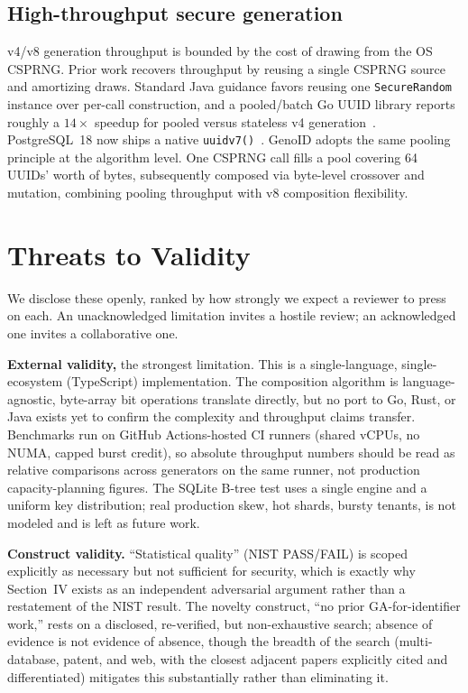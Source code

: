 \documentclass[conference]{IEEEtran}
\begin{document}
\subsection{High-throughput secure generation}
v4/v8 generation throughput is bounded by the cost of drawing from the OS CSPRNG. Prior work recovers throughput by reusing a single CSPRNG source and amortizing draws. Standard Java guidance favors reusing one \texttt{SecureRandom} instance over per-call construction, and a pooled/batch Go UUID library reports roughly a $14\times$ speedup for pooled versus stateless v4 generation~\cite{14}. PostgreSQL~18 now ships a native \texttt{uuidv7()}~\cite{18}. GenoID adopts the same pooling principle at the algorithm level. One CSPRNG call fills a pool covering 64 UUIDs' worth of bytes, subsequently composed via byte-level crossover and mutation, combining pooling throughput with v8 composition flexibility.

\section{Threats to Validity}
We disclose these openly, ranked by how strongly we expect a reviewer to press on each. An unacknowledged limitation invites a hostile review; an acknowledged one invites a collaborative one.

\textbf{External validity,} the strongest limitation. This is a single-language, single-ecosystem (TypeScript) implementation. The composition algorithm is language-agnostic, byte-array bit operations translate directly, but no port to Go, Rust, or Java exists yet to confirm the complexity and throughput claims transfer. Benchmarks run on GitHub Actions-hosted CI runners (shared vCPUs, no NUMA, capped burst credit), so absolute throughput numbers should be read as relative comparisons across generators on the same runner, not production capacity-planning figures. The SQLite B-tree test uses a single engine and a uniform key distribution; real production skew, hot shards, bursty tenants, is not modeled and is left as future work.

\textbf{Construct validity.} ``Statistical quality'' (NIST PASS/FAIL) is scoped explicitly as necessary but not sufficient for security, which is exactly why Section~IV exists as an independent adversarial argument rather than a restatement of the NIST result. The novelty construct, ``no prior GA-for-identifier work,'' rests on a disclosed, re-verified, but non-exhaustive search; absence of evidence is not evidence of absence, though the breadth of the search (multi-database, patent, and web, with the closest adjacent papers explicitly cited and differentiated) mitigates this substantially rather than eliminating it.
\end{document}
